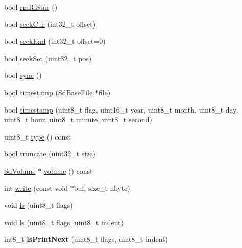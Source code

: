 \begin{DoxyCompactItemize}
\item 
bool \hyperlink{class_sd_base_file_a4186ba79c83005971096966c0fd02d46}{rm\+Rf\+Star} ()
\item 
bool \hyperlink{class_sd_base_file_ab04ec7e129607973f6e3436f779b6501}{seek\+Cur} (int32\+\_\+t offset)
\item 
bool \hyperlink{class_sd_base_file_a6f42e496b179dbdd2c09083cfad28613}{seek\+End} (int32\+\_\+t offset=0)
\item 
bool \hyperlink{class_sd_base_file_afe6aeaf0ca7573ceb8bb335c802dab16}{seek\+Set} (uint32\+\_\+t pos)
\item 
bool \hyperlink{class_sd_base_file_a292247972772be832f2c6ea166f4049a}{sync} ()
\item 
bool \hyperlink{class_sd_base_file_adf84a0487f3b45fc183756b9d17141cd}{timestamp} (\hyperlink{class_sd_base_file}{Sd\+Base\+File} $\ast$file)
\item 
bool \hyperlink{class_sd_base_file_ae55ad6000c44fc73e15934381b305dc4}{timestamp} (uint8\+\_\+t flag, uint16\+\_\+t year, uint8\+\_\+t month, uint8\+\_\+t day, uint8\+\_\+t hour, uint8\+\_\+t minute, uint8\+\_\+t second)
\item 
uint8\+\_\+t \hyperlink{class_sd_base_file_a1555e6866abc9c867c5fff189a3a4317}{type} () const 
\item 
bool \hyperlink{class_sd_base_file_a9d1ad1abbd90089f731de81de1708c19}{truncate} (uint32\+\_\+t size)
\item 
\hyperlink{class_sd_volume}{Sd\+Volume} $\ast$ \hyperlink{class_sd_base_file_acb021c2b7f68778d683d093775532a06}{volume} () const 
\item 
int \hyperlink{class_sd_base_file_a874e3bae567f96bed5ad442beb846a61}{write} (const void $\ast$buf, size\+\_\+t nbyte)
\item 
void \hyperlink{class_sd_base_file_a55fc61c4c1298544a5ea96440b4cdbb3}{ls} (uint8\+\_\+t flags)
\item 
void \hyperlink{class_sd_base_file_a87b5e05d15e0eb11088935db50ee19db}{ls} (uint8\+\_\+t flags, uint8\+\_\+t indent)
\item 
int8\+\_\+t {\bfseries ls\+Print\+Next} (uint8\+\_\+t flags, uint8\+\_\+t indent)\hypertarget{class_sd_base_file_a5f24fc14787b3c9b9726f4ba295e2633}{}\label{class_sd_base_file_a5f24fc14787b3c9b9726f4ba295e2633}

\end{DoxyCompactItemize}
